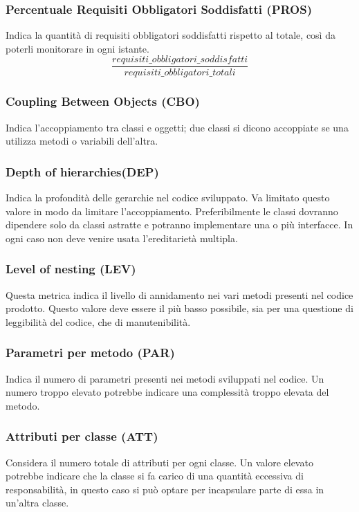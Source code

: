 \subsubsection{Percentuale Requisiti Obbligatori Soddisfatti (PROS)}
Indica la quantità di requisiti obbligatori soddisfatti rispetto al totale, così da poterli monitorare in ogni istante.
\[\frac{requisiti\_obbligatori\_soddisfatti}{requisiti\_obbligatori\_totali}\]

\subsubsection{Coupling Between Objects (CBO)}
Indica l'accoppiamento tra classi e oggetti; due classi si dicono accoppiate se una utilizza metodi o variabili dell'altra.

\subsubsection{Depth of hierarchies(DEP)}
Indica la profondità delle gerarchie nel codice sviluppato. Va limitato questo valore in modo da limitare l'accoppiamento. Preferibilmente le classi dovranno dipendere solo da classi astratte e potranno implementare una o più interfacce. In ogni caso non deve venire usata l'ereditarietà multipla.

\subsubsection{Level of nesting (LEV)}
Questa metrica indica il livello di annidamento nei vari metodi presenti nel codice prodotto. Questo valore deve essere il più basso possibile, sia per una questione di leggibilità del codice, che di manutenibilità.


\subsubsection{Parametri per metodo (PAR)}
Indica il numero di parametri presenti nei metodi sviluppati nel codice. Un numero troppo elevato potrebbe indicare una complessità troppo elevata del metodo.

\subsubsection{Attributi per classe (ATT)}
Considera il numero totale di attributi per ogni classe. Un valore elevato potrebbe indicare che la classe si fa carico di una quantità eccessiva di responsabilità, in questo caso si può optare per incapsulare parte di essa in un'altra classe.

